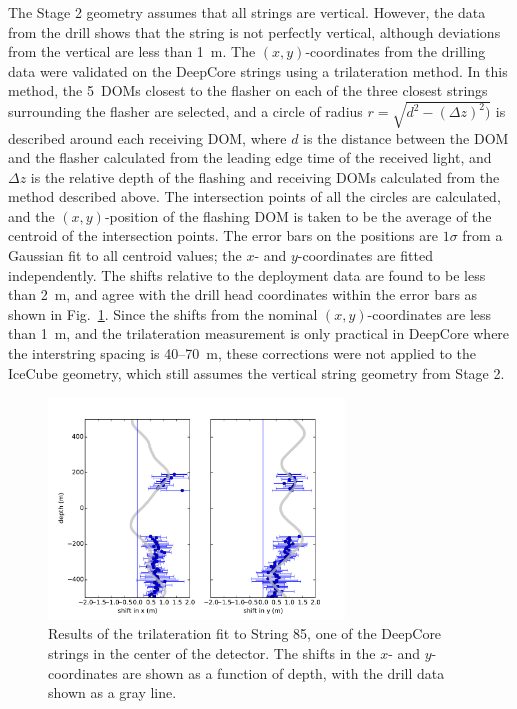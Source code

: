 The Stage 2 geometry assumes that all strings are vertical. However, the
data from the drill shows that the string is not perfectly vertical,
although deviations from the vertical are less than 1~m. The
$(x,y)$-coordinates from the drilling data were validated on the DeepCore strings
using a trilateration method. In this method, the 5~DOMs closest to the
flasher on each of the three closest strings surrounding the flasher are
selected, and a circle of radius $r = \sqrt{d^2 - (\Delta z)^2)}$ is
described around each receiving DOM, where $d$ is the distance between the DOM
and the flasher calculated from the leading edge time of the received
light, and $\Delta z$ is the relative depth of the flashing and receiving
DOMs calculated from the method described above. The intersection points of
all the circles are calculated, and the $(x,y)$-position of the flashing DOM
is taken to be the average of the centroid of the intersection points. The
error bars on the positions are $1 \sigma$ from a Gaussian fit to all
centroid values; the $x$- and $y$-coordinates are fitted independently. The
shifts relative to the deployment data are found to be less than 2~m, and
agree with the drill head coordinates within the error bars as shown in
Fig.~\ref{fig:trilateration}. Since the shifts from the nominal
$(x,y)$-coordinates are less than 1~m, and the trilateration measurement is only
practical in DeepCore where the interstring spacing is 40--70~m, these
corrections were not applied to the IceCube geometry, which still assumes
the vertical string geometry from Stage 2.

\begin{figure}[!ht]
 \centering
 \includegraphics[width=0.7\textwidth]{graphics/geometry/newtrilat85.pdf}
\caption{Results of the trilateration fit to String 85, one of the DeepCore
  strings in the center of the detector. The shifts in the
  $x$- and $y$-coordinates are shown as a function of depth, with the drill data
  shown as a gray line.}
\label{fig:trilateration}
\end{figure}

